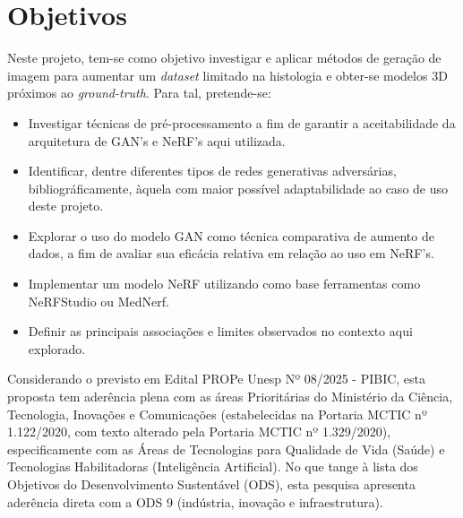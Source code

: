 \section{Objetivos}


Neste projeto, tem-se como objetivo investigar e aplicar métodos de geração de imagem para aumentar um \textit{dataset} limitado na histologia e obter-se modelos 3D próximos ao \textit{ground-truth}. Para tal, pretende-se:

\begin{itemize}
  \item Investigar técnicas de pré-processamento a fim de garantir a aceitabilidade da arquitetura de GAN's e NeRF's aqui utilizada. 
  \item Identificar, dentre diferentes tipos de redes generativas adversárias, bibliográficamente, àquela com maior possível adaptabilidade ao caso de uso deste projeto. 
  \item Explorar o uso do modelo GAN como técnica comparativa de aumento de dados, a fim de avaliar sua eficácia relativa em relação ao uso em NeRF's.
  \item Implementar um modelo NeRF utilizando como base ferramentas como NeRFStudio ou MedNerf.
  \item Definir as principais associações e limites observados no contexto aqui explorado.
\end{itemize}

%
%    
%
Considerando o previsto em Edital PROPe Unesp Nº 08/2025 - PIBIC, esta proposta tem aderência plena com as áreas Prioritárias do Ministério da Ciência, Tecnologia, Inovações e Comunicações (estabelecidas na Portaria MCTIC nº 1.122/2020, com texto alterado pela Portaria MCTIC nº 1.329/2020), especificamente com as Áreas de Tecnologias para Qualidade de Vida (Saúde) e Tecnologias Habilitadoras (Inteligência Artificial). No que tange à lista dos Objetivos do Desenvolvimento Sustentável (ODS), esta pesquisa apresenta aderência direta com a ODS 9 (indústria, inovação e infraestrutura).
